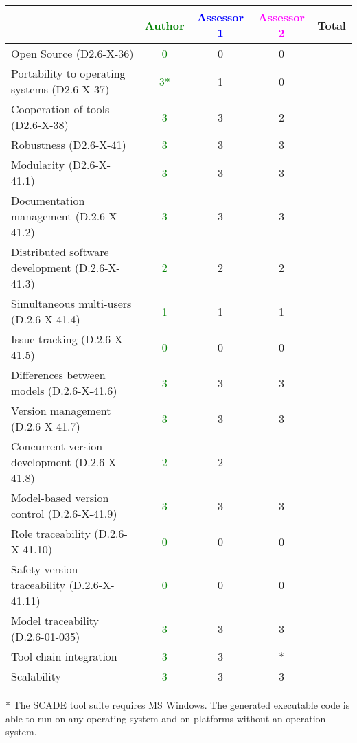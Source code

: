 \begin{tabular}{|l | c | c | c | c|}
\hline
& \textcolor{green}{Author} & \textcolor{blue}{Assessor 1} & \textcolor{magenta}{Assessor 2} & Total \\
\hline 
Open Source (D2.6-X-36) &  \textcolor{green}{0}& 0 &0 &  \\
\hline 
Portability to operating systems (D2.6-X-37) &  \textcolor{green}{3*}&
1 &0 &  \\
\hline
Cooperation of tools (D2.6-X-38) &  \textcolor{green}{3}& 3 &2 &  \\
\hline
Robustness (D2.6-X-41) &  \textcolor{green}{3}& 3 &3 & \\
\hline
Modularity (D2.6-X-41.1) &  \textcolor{green}{3}& 3 &3 & \\
\hline
Documentation management (D.2.6-X-41.2) &  \textcolor{green}{3}& 3 &3 & \\
\hline
Distributed software development (D.2.6-X-41.3)  &
\textcolor{green}{2}& 2 &2 & \\
\hline
Simultaneous multi-users (D.2.6-X-41.4)   &  \textcolor{green}{1}& 1 &1 & \\
\hline
Issue tracking (D.2.6-X-41.5) &  \textcolor{green}{0}&0 &0 & \\
\hline
Differences between models (D.2.6-X-41.6) &  \textcolor{green}{3}& 3 &3 & \\
\hline
Version management (D.2.6-X-41.7) &  \textcolor{green}{3}& 3 &3 & \\
\hline
Concurrent version development (D.2.6-X-41.8) &  \textcolor{green}{2}&
2& & \\
\hline
Model-based version control (D.2.6-X-41.9) &  \textcolor{green}{3}& 3 &3 & \\
\hline
Role traceability (D.2.6-X-41.10) &  \textcolor{green}{0}& 0 &0 & \\
\hline
Safety version traceability (D.2.6-X-41.11) &  \textcolor{green}{0}& 0 &0 & \\
\hline
Model traceability (D.2.6-01-035) & \textcolor{green}{3} & 3 &3 & \\
\hline
Tool chain integration & \textcolor{green}{3} & 3 &* & \\
\hline
Scalability & \textcolor{green}{3} & 3 &3 & \\
\hline
\end{tabular}

\begin{author_comment}
* The SCADE tool suite requires MS Windows. The generated executable code is able to run on any operating system and on platforms without an operation system.   
\end{author_comment}

